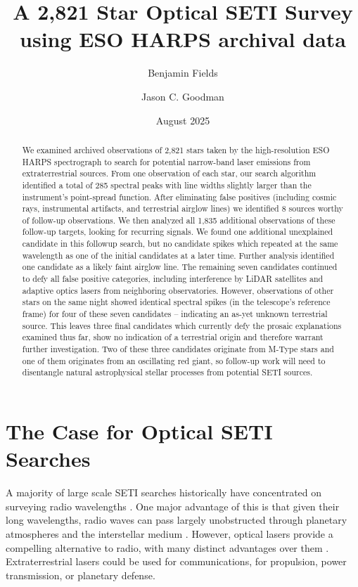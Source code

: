 \documentclass[twocolumn]{aastex701}
\begin{document}
\title{A 2,821 Star Optical SETI Survey using ESO HARPS archival data}
\author[0009-0008-7048-916X]{Benjamin Fields} %

\author[0000-0002-6755-2710]{Jason C. Goodman}

\date{August 2025}

\begin{abstract}
We examined archived observations of 2,821 stars taken by the high-resolution ESO HARPS spectrograph to search for potential narrow-band laser emissions from extraterrestrial sources. From one observation of each star, our search algorithm identified a total of 285 spectral peaks with line widths slightly larger than the instrument's point-spread function.  After eliminating  false positives (including cosmic rays, instrumental artifacts, and terrestrial airglow lines) we identified 8 sources worthy of follow-up observations. We then analyzed all 1,835 additional observations of these follow-up targets, looking for recurring signals. We found one additional unexplained candidate in this followup search, but no candidate spikes which repeated at the same wavelength as one of the initial candidates at a later time.  Further analysis identified one candidate as a likely faint airglow line. The remaining seven candidates continued to defy all false positive categories, including interference by LiDAR satellites and adaptive optics lasers from neighboring observatories. However, observations of other stars on the same night showed identical spectral spikes (in the telescope's reference frame) for four of these seven candidates -- indicating an as-yet unknown terrestrial source. This leaves three final candidates which currently defy the prosaic explanations examined thus far, show no indication of a terrestrial origin and therefore warrant further investigation. Two of these three candidates originate from M-Type stars and one of them originates from an oscillating red giant, so follow-up work will need to disentangle natural astrophysical stellar processes from potential SETI sources.
\end{abstract}

\section{The Case for Optical SETI Searches}
A majority of large scale SETI searches historically have concentrated on surveying radio wavelengths \citep{Gray_2017,OZMAII,LAMPTON1992189,Price_2020,PeterMa,Wright_2018}. One major advantage of this is that given their long wavelengths, radio waves can pass largely unobstructed through planetary atmospheres and the interstellar medium \citep{COCCONI_MORRISON_1959}. However, optical lasers provide a compelling alternative to radio, with many distinct advantages over them \citep{caseforopticalseti}. Extraterrestrial lasers could be used for communications, for propulsion, power transmission, or planetary defense.  
\end{document}
